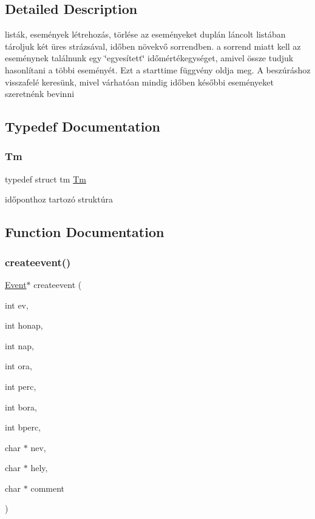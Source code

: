 \subsection{Detailed Description}
listák, események létrehozás, törlése az eseményeket duplán láncolt listában tároljuk két üres strázsával, időben növekvő sorrendben. a sorrend miatt kell az eseménynek találnunk egy \char`\"{}egyesített\char`\"{} időmértékegységet, amivel össze tudjuk hasonlítani a többi eseményét. Ezt a starttime függvény oldja meg. A beszúráshoz visszafelé keresünk, mivel várhatóan mindig időben későbbi eseményeket szeretnénk bevinni 



\subsection{Typedef Documentation}
\mbox{\label{group__list_gaffc453d30a4a6ce81ed778fd04d2d256}} 
\subsubsection{\texorpdfstring{Tm}{Tm}}
{\footnotesize\ttfamily typedef struct tm \hyperlink{group__list_gaffc453d30a4a6ce81ed778fd04d2d256}{Tm}}

időponthoz tartozó struktúra 

\subsection{Function Documentation}
\mbox{\label{group__list_ga24fd1b37eee54600b66c42e86b52244a}} 
\subsubsection{\texorpdfstring{createevent()}{createevent()}}
{\footnotesize\ttfamily \hyperlink{struct_event}{Event}$\ast$ createevent (\begin{DoxyParamCaption}\item[{int}]{ev,  }\item[{int}]{honap,  }\item[{int}]{nap,  }\item[{int}]{ora,  }\item[{int}]{perc,  }\item[{int}]{bora,  }\item[{int}]{bperc,  }\item[{char $\ast$}]{nev,  }\item[{char $\ast$}]{hely,  }\item[{char $\ast$}]{comment }\end{DoxyParamCaption})}

